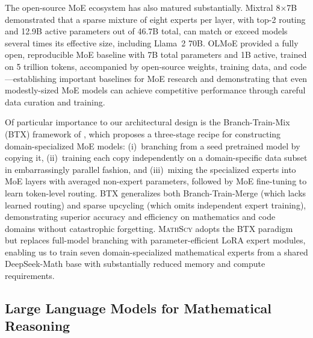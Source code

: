 \documentclass[11pt,a4paper]{article}
\newcommand{\mathscy}{\textsc{MathScy}}
\begin{document}
The open-source MoE ecosystem has also matured substantially. Mixtral 8$\times$7B \citep{jiang2024mixtral} demonstrated that a sparse mixture of eight experts per layer, with top-2 routing and 12.9B active parameters out of 46.7B total, can match or exceed models several times its effective size, including Llama~2 70B. OLMoE \citep{muennighoff2024olmoe} provided a fully open, reproducible MoE baseline with 7B total parameters and 1B active, trained on 5 trillion tokens, accompanied by open-source weights, training data, and code---establishing important baselines for MoE research and demonstrating that even modestly-sized MoE models can achieve competitive performance through careful data curation and training.

Of particular importance to our architectural design is the Branch-Train-Mix (BTX) framework of \cite{sukhbaatar2024branch}, which proposes a three-stage recipe for constructing domain-specialized MoE models: (i)~branching from a seed pretrained model by copying it, (ii)~training each copy independently on a domain-specific data subset in embarrassingly parallel fashion, and (iii)~mixing the specialized experts into MoE layers with averaged non-expert parameters, followed by MoE fine-tuning to learn token-level routing. BTX generalizes both Branch-Train-Merge \citep{li2022branch} (which lacks learned routing) and sparse upcycling (which omits independent expert training), demonstrating superior accuracy and efficiency on mathematics and code domains without catastrophic forgetting. \mathscy{} adopts the BTX paradigm but replaces full-model branching with parameter-efficient LoRA expert modules, enabling us to train seven domain-specialized mathematical experts from a shared DeepSeek-Math base with substantially reduced memory and compute requirements.

\subsection{Large Language Models for Mathematical Reasoning}
\end{document}
